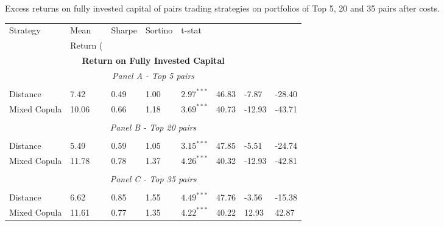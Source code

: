 \documentclass[a4paper]{article}
\begin{document}
		\begin{threeparttable}[H]
		\centering \tiny
		\caption{Excess returns on fully invested capital of pairs trading strategies on portfolios of Top 5, 20 and 35 pairs after costs. }
		\begin{tabularx}{\textwidth}{@{\extracolsep{\fill}}llllllll@{}}
			\toprule
			Strategy & Mean  & Sharpe & Sortino & t-stat & \\%
			& Return (\\%
			\midrule
			\multicolumn{8}{c}{\textbf{Return on Fully Invested Capital}} \\
			\multicolumn{8}{c}{\textit{Panel A - Top 5 pairs}} \\
			&       &       &       &       &       &       &  \\
			Distance & 7.42  & 0.49  & 1.00  & $2.97^{***}$  & 46.83 & -7.87    & -28.40 \\
			Mixed Copula & 10.06  & 0.66  & 1.18  & $3.69^{***}$  & 40.73 & -12.93  & -43.71 \\
			\multicolumn{1}{r}{} & \multicolumn{1}{r}{} & \multicolumn{1}{r}{} & \multicolumn{1}{r}{} & \multicolumn{1}{r}{} & \multicolumn{1}{r}{} & \multicolumn{1}{r}{} & \multicolumn{1}{r}{} \\
			\multicolumn{8}{c}{\textit{Panel B - Top 20 pairs}} \\
			&       &       &       &       &       &       &  \\
			Distance & 5.49  & 0.59  & 1.05  & $ 3.15^{***}$  & 47.85 & -5.51  & -24.74 \\
			Mixed Copula  & 11.78  & 0.78  & 1.37  & $4.26^{***}$  & 40.32  & -12.93  & -42.81  \\
			\multicolumn{1}{r}{} & \multicolumn{1}{r}{} & \multicolumn{1}{r}{} & \multicolumn{1}{r}{} & \multicolumn{1}{r}{} & \multicolumn{1}{r}{} & \multicolumn{1}{r}{} & \multicolumn{1}{r}{} \\
			\multicolumn{8}{c}{\textit{Panel C - Top 35 pairs}} \\
			&       &       &       &       &       &       &  \\
			Distance & 6.62  & 0.85  & 1.55  & $4.49^{***}$  & 47.76 & -3.56  & -15.38 \\
			Mixed Copula & 11.61 & 0.77  & 1.35  & $4.22^{***}$  & 40.22 & 12.93 & 42.87 \\
			

\end{tabularx}
\end{threeparttable}
\end{document}
